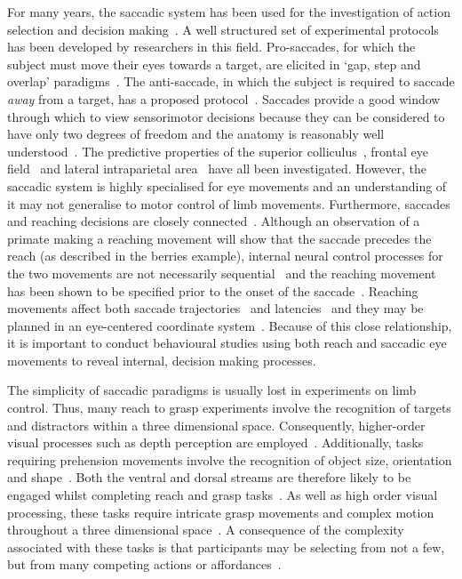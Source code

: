 \documentclass[10pt,letterpaper]{article}
\begin{document}
For many years, the saccadic system has been used for the
investigation of action selection and decision
making~\cite{deubel_saccade_1996,mcpeek_saccade_2002,carpenter_contrast_2004,rorie_integration_2010,bompas_saccadic_2011,reppert_modulation_2015}. A
well structured set of experimental protocols has been developed by
researchers in this field. Pro-saccades, for which the subject must
move their eyes towards a target, are elicited in `gap, step and
overlap' paradigms~\cite{saslow_effects_1967}. The anti-saccade, in
which the subject is required to saccade \emph{away} from a target,
has a proposed
protocol~\cite{antoniades_internationally_2013}. Saccades provide a
good window through which to view sensorimotor decisions because they
can be considered to have only two degrees of freedom and the anatomy
is reasonably well
understood~\cite{moschovakis_anatomy_1994,moschovakis_microscopic_1996,sparks_brainstem_2002}.
The predictive properties of the superior
colliculus~\cite{ratcliff_comparison_2003}, frontal eye
field~\cite{schall_neural_1993} and lateral intraparietal
area~\cite{hanks_microstimulation_2006,rorie_integration_2010} have
all been investigated.  However, the saccadic system is highly
specialised for eye movements and an understanding of it may not
generalise to motor control of limb movements. Furthermore, saccades
and reaching decisions are closely
connected~\cite{gribble_hand-eye_2002}. Although an observation of a
primate making a reaching movement will show that the saccade precedes
the reach (as described in the berries example), internal neural
control processes for the two movements are not necessarily
sequential~\cite{carey_eyehand_2000} and the reaching movement has
been shown to be specified prior to the onset of the
saccade~\cite{gribble_hand-eye_2002}. Reaching movements affect both
saccade trajectories~\cite{tipper_reaching_2001} and
latencies~\cite{fisk_organization_1985,neggers_ocular_2000,snyder_eye-hand_2002}
and they may be planned in an eye-centered coordinate
system~\cite{batista_reach_1999,tipper_reaching_2001}. Because of this
close relationship, it is important to conduct behavioural studies
using both reach and saccadic eye movements to reveal internal,
decision making processes.

The simplicity of saccadic paradigms is usually lost in experiments on
limb control. Thus, many reach to grasp experiments involve the
recognition of targets and distractors within a three dimensional
space. Consequently, higher-order visual processes such as depth
perception are employed~\cite{welsh_movement_2004}. Additionally,
tasks requiring prehension movements involve the recognition of object
size, orientation and shape~\cite{meegan_visual_1999}. Both the
ventral and dorsal streams are therefore likely to be engaged whilst
completing reach and grasp tasks~\cite{milner_two_2008}. As well as
high order visual processing, these tasks require intricate grasp
movements and complex motion throughout a three dimensional
space~\cite{howard_hand_1997,tipper_selective_1997,
  tipper_actionbased_1998,castiello_mechanisms_1999,jackson_are_1995}. A
consequence of the complexity associated with these tasks is that
participants may be selecting from not a few, but from many competing
actions or affordances~\cite{cisek_cortical_2007}.
\end{document}
